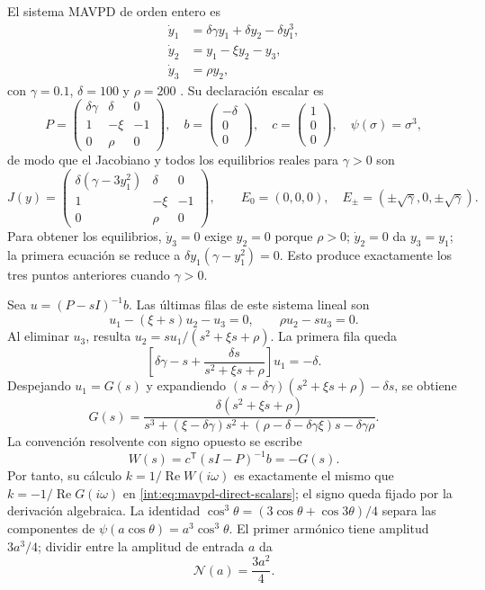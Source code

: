 El sistema MAVPD de orden entero es
\begin{align}
 \dot y_1&=\delta\gamma y_1+\delta y_2-\delta y_1^3,\nonumber\\
 \dot y_2&=y_1-\xi y_2-y_3,\label{int:eq:mavpd}\\
 \dot y_3&=\rho y_2,\nonumber
\end{align}
con \(\gamma=0.1\), \(\delta=100\) y \(\rho=200\)
\cite{matouk2023}. Su declaración escalar es
\[
 P=\begin{pmatrix}
 \delta\gamma&\delta&0\\
 1&-\xi&-1\\
 0&\rho&0
 \end{pmatrix},\quad
 b=\begin{pmatrix}-\delta\\0\\0\end{pmatrix},\quad
 c=\begin{pmatrix}1\\0\\0\end{pmatrix},\quad
 \psi(\sigma)=\sigma^3,
\]
de modo que el Jacobiano y todos los equilibrios reales para \(\gamma>0\) son
\begin{equation}
 J(y)=\begin{pmatrix}
 \delta(\gamma-3y_1^2)&\delta&0\\
 1&-\xi&-1\\
 0&\rho&0
 \end{pmatrix},\qquad
 E_0=(0,0,0),\quad
 E_\pm=(\pm\sqrt{\gamma},0,\pm\sqrt{\gamma}).
 \label{int:eq:mavpd-jacobian}
\end{equation}
Para obtener los equilibrios, \(\dot y_3=0\) exige \(y_2=0\) porque
\(\rho>0\); \(\dot y_2=0\) da \(y_3=y_1\); la primera ecuación se reduce
a \(\delta y_1(\gamma-y_1^2)=0\). Esto produce exactamente los tres puntos
anteriores cuando \(\gamma>0\).

Sea \(u=(P-sI)^{-1}b\). Las últimas filas de este sistema lineal son
\[
 u_1-(\xi+s)u_2-u_3=0,\qquad \rho u_2-su_3=0.
\]
Al eliminar \(u_3\), resulta
\(u_2=su_1/(s^2+\xi s+\rho)\). La primera fila queda
\[
 \left[\delta\gamma-s+\frac{\delta s}{s^2+\xi s+\rho}\right]u_1=-\delta.
\]
Despejando \(u_1=G(s)\) y expandiendo
\((s-\delta\gamma)(s^2+\xi s+\rho)-\delta s\), se obtiene
\begin{equation}
 G(s)=\frac{\delta(s^2+\xi s+\rho)}
 {s^3+(\xi-\delta\gamma)s^2+
 (\rho-\delta-\delta\gamma\xi)s-\delta\gamma\rho}.
 \label{int:eq:mavpd-transfer}
\end{equation}
La convención resolvente con signo opuesto se escribe
\[
 W(s)=c^{\mathsf T}(sI-P)^{-1}b=-G(s).
\]
Por tanto, su cálculo \(k=1/\operatorname{Re}W(i\omega)\) es exactamente el
mismo que \(k=-1/\operatorname{Re}G(i\omega)\) en
\eqref{int:eq:mavpd-direct-scalars}; el signo queda fijado por la derivación
algebraica.
La identidad \(\cos^3\theta=(3\cos\theta+\cos3\theta)/4\) separa las
componentes de \(\psi(a\cos\theta)=a^3\cos^3\theta\). El primer armónico
tiene amplitud \(3a^3/4\); dividir entre la amplitud de entrada \(a\) da
\begin{equation}
  \mathcal N(a)=\frac{3a^2}{4}.
\end{equation}

